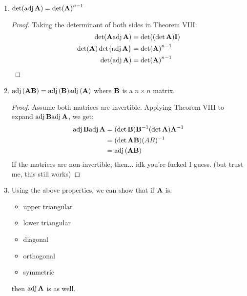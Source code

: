 \documentclass{article}
\begin{document}
\begin{enumerate}
\begin{proof}
\begin{equation*}
                \bff{A}^T\adj(\bff{A})^T = \bff{A}^T\adj(\bff{A}^T)
            \end{equation*}
            If $\bff{A}$ is not the zero matrix, then this directly proves it. If $\bff{A}$ is the zero matrix, then from property $1$, we get: $\adj(\bff{A}^T)=\bff{0}$ and $\adj(\bff{A})^T = \bff{0}^T=\bff{0}$.
        \end{proof}
        \item $\det(\mathrm{adj}\,\mathbf{A})= \det(\mathbf{A})^{n-1}$
        \begin{proof}
            Taking the determinant of both sides in Theorem VIII:
            \begin{align*}
                \det(\mathbf{A}\mathrm{adj}\,\mathbf{A})&=\det((\det \mathbf{A})\mathbf{I}) \\ 
                \det(\mathbf{A})\det{\mathrm{adj}\,\mathbf{A}}&=\det(\mathbf{A})^{n-1} \\ 
                \det(\mathrm{adj}\,\mathbf{A}) &= \det(\mathbf{A})^{n-1}
            \end{align*}
        \end{proof}
        \item $\mathrm{adj}\,(\mathbf{A}\mathbf{B})=\mathrm{adj}\,(\mathbf{B})\mathrm{adj}\,(\mathbf{A})$ where $\mathbf{B}$ is a $n\times n$ matrix.
        \begin{proof}
            Assume both matrices are invertible. Applying Theorem VIII to expand $\mathrm{adj}\,\mathbf{B}\mathrm{adj}\,\mathbf{A}$, we get:
            \begin{align*}
                \mathrm{adj}\,\mathbf{B}\mathrm{adj}\,\mathbf{A} &= (\det \mathbf{B})\mathbf{B}^{-1}(\det \mathbf{A})\mathbf{A}^{-1} \\ 
                &= (\det \mathbf{AB})(AB)^{-1} \\ 
                &= \mathrm{adj}\,(\mathbf{AB})
            \end{align*}
            If the matrices are non-invertible, then... idk you're fucked I guess. (but trust me, this still works)
        \end{proof}
        \item Using the above properties, we can show that if $\mathbf{A}$ is:
        \begin{itemize}
            \item upper triangular
            \item lower triangular
            \item diagonal
            \item orthogonal
            \item symmetric
        \end{itemize}
        then $\mathrm{adj}\,\mathbf{A}$ is as well.

\end{enumerate}
\end{document}
